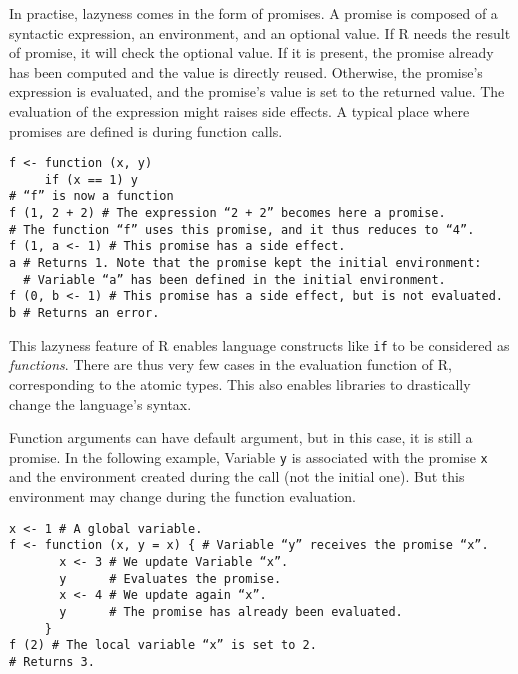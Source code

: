 \documentclass{article}
\newcommand\R{R}
\begin{document}
In practise, lazyness comes in the form of promises.
A promise is composed of a syntactic expression,
an environment, and an optional value.
If \R{} needs the result of promise,
it will check the optional value.
If it is present, the promise already has been computed
and the value is directly reused.
Otherwise, the promise’s expression is evaluated,
and the promise’s value is set to the returned value.
The evaluation of the expression might raises side effects.
%
A typical place where promises are defined
is during function calls.
\begin{verbatim}
f <- function (x, y)
     if (x == 1) y
# “f” is now a function
f (1, 2 + 2) # The expression “2 + 2” becomes here a promise.
# The function “f” uses this promise, and it thus reduces to “4”.
f (1, a <- 1) # This promise has a side effect.
a # Returns 1. Note that the promise kept the initial environment:
  # Variable “a” has been defined in the initial environment.
f (0, b <- 1) # This promise has a side effect, but is not evaluated.
b # Returns an error.
\end{verbatim}

This lazyness feature of \R{} enables
language constructs like \texttt{if}
to be considered as \emph{functions}.
There are thus very few cases in the evaluation function
of \R{}, corresponding to the atomic types.
This also enables libraries to drastically change
the language’s syntax.

Function arguments can have default argument,
but in this case, it is still a promise.
In the following example,
Variable \texttt{y} is associated with
the promise \texttt{x} and the environment
created during the call (not the initial one).
But this environment may change during the function evaluation.
\begin{verbatim}
x <- 1 # A global variable.
f <- function (x, y = x) { # Variable “y” receives the promise “x”.
       x <- 3 # We update Variable “x”.
       y      # Evaluates the promise.
       x <- 4 # We update again “x”.
       y      # The promise has already been evaluated.
     }
f (2) # The local variable “x” is set to 2.
# Returns 3.
\end{verbatim}
\end{document}

